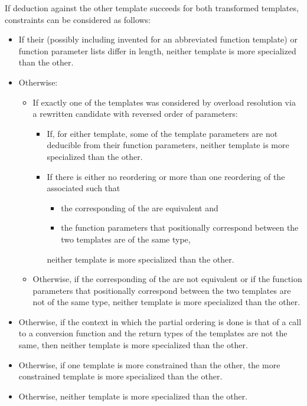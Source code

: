 \pnum
If deduction against the other template succeeds for both transformed templates,
constraints can be considered as follows:
\begin{itemize}
\item
If their 
(possibly including 
invented for an abbreviated function template) or
function parameter lists differ in length,
neither template is more specialized than the other.
\item
Otherwise:
\begin{itemize}
\item
If exactly one of the templates was considered by overload resolution
via a rewritten candidate with reversed order of parameters:
\begin{itemize}
\item
If, for either template, some of the template parameters
are not deducible from their function parameters,
neither template is more specialized than the other.
\item
If there is either no reordering or more than one reordering
of the associated 
such that
\begin{itemize}
\item
the corresponding 
of the  are equivalent and
\item
the function parameters that positionally correspond
between the two templates are of the same type,
\end{itemize}
neither template is more specialized than the other.
\end{itemize}
\item
Otherwise, if the corresponding 
of the 
are not equivalent or
if the function parameters that positionally correspond
between the two templates are not of the same type,
neither template is more specialized than the other.
\end{itemize}
\item
Otherwise, if the context in which the partial ordering is done
is that of a call to a conversion function and
the return types of the templates are not the same,
then neither template is more specialized than the other.
\item
Otherwise,
if one template is more constrained than the other,
the more constrained template is more specialized than the other.
\item
Otherwise, neither template is more specialized than the other.
\end{itemize}
